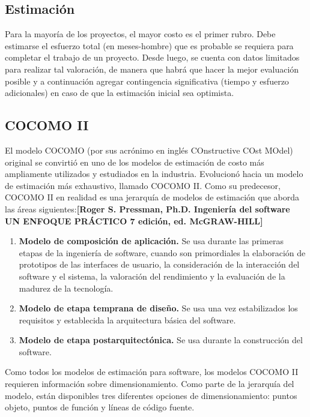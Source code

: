 

\subsection*{Estimación}
Para la mayoría de los proyectos, el mayor costo es el primer rubro. Debe estimarse el esfuerzo total (en meses-hombre) que es probable se requiera para completar el trabajo de un proyecto. Desde luego, se cuenta con datos limitados para realizar tal valoración, de manera que habrá que hacer la mejor evaluación posible y a continuación agregar contingencia significativa (tiempo y esfuerzo adicionales) en caso de que la estimación inicial sea optimista.
\subsection{COCOMO II}

El modelo COCOMO (por sus acrónimo en inglés COnstructive COst MOdel) original se convirtió en uno de los modelos de estimación de costo más ampliamente utilizados y estudiados en la industria. Evolucionó hacia un modelo de estimación más exhaustivo, llamado COCOMO II. Como su predecesor, COCOMO II en realidad es una jerarquía de modelos de estimación que aborda las áreas siguientes:\textbf{[Roger S. Pressman, Ph.D. Ingeniería del software UN ENFOQUE PRÁCTICO 7 edición, ed. McGRAW-HILL]}
\begin{enumerate}
	\item \textbf{Modelo de composición de aplicación.} Se usa durante las primeras etapas de la ingeniería de software, cuando son primordiales la elaboración de prototipos de las interfaces de usuario, la consideración de la interacción del software y el sistema, la valoración del rendimiento y la evaluación de la madurez de la tecnología.
	
	\item \textbf{Modelo de etapa temprana de diseño.} Se usa una vez estabilizados los requisitos y establecida la arquitectura básica del software.
	
	\item \textbf{Modelo de etapa postarquitectónica.} Se usa durante la construcción del software.
\end{enumerate}


Como todos los modelos de estimación para software, los modelos COCOMO II requieren información sobre dimensionamiento. Como parte de la jerarquía del modelo, están disponibles tres diferentes opciones de dimensionamiento: puntos objeto, puntos de función y líneas de código fuente.


